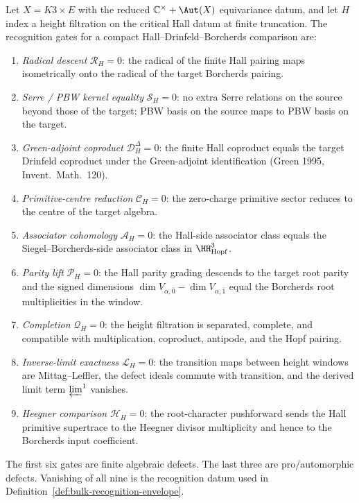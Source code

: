 \begin{definition}
\label{def:bulk-compact-coha-gates}
Let $X = K3 \times E$ with the reduced $\mathbb C^{\times} +
\Aut(X)$ equivariance datum, and let $H$ index a height filtration on
the critical Hall datum at finite truncation. The recognition gates for
a compact Hall--Drinfeld--Borcherds comparison are:
\begin{enumerate}[label=\textup{(O\arabic*)},leftmargin=2.4em,itemsep=2pt]
\item \emph{Radical descent} $\mathcal R_{H} = 0$: the radical of the
finite Hall pairing maps isometrically onto the radical of the target
Borcherds pairing.
\item \emph{Serre / PBW kernel equality} $\mathcal S_{H} = 0$: no
extra Serre relations on the source beyond those of the target;
PBW basis on the source maps to PBW basis on the target.
\item \emph{Green-adjoint coproduct} $\mathcal D^{\Delta}_{H} = 0$: the
finite Hall coproduct equals the target Drinfeld coproduct under
the Green-adjoint identification (Green 1995, Invent.\ Math.\
120).
\item \emph{Primitive-centre reduction} $\mathcal C_{H} = 0$: the
zero-charge primitive sector reduces to the centre of the target
algebra.
\item \emph{Associator cohomology} $\mathcal A_{H} = 0$: the
Hall-side associator class equals the Siegel--Borcherds-side
associator class in $\HH^{3}_{\mathrm{Hopf}}$.
\item \emph{Parity lift} $\mathcal P_{H} = 0$: the Hall parity grading
descends to the target root parity and the signed dimensions
$\dim V_{\alpha,\bar 0}-\dim V_{\alpha,\bar 1}$ equal the Borcherds
root multiplicities in the window.
\item \emph{Completion} $\mathcal Q_{H} = 0$: the height
filtration is separated, complete, and compatible with multiplication,
coproduct, antipode, and the Hopf pairing.
\item \emph{Inverse-limit exactness} $\mathcal L_{H} = 0$: the
transition maps between height windows are Mittag--Leffler, the defect
ideals commute with transition, and the derived limit term
$\varprojlim^{1}$ vanishes.
\item \emph{Heegner comparison} $\mathcal H_{H} = 0$: the root-character
pushforward sends the Hall primitive supertrace to the Heegner divisor
multiplicity and hence to the Borcherds input coefficient.
\end{enumerate}
The first six gates are finite algebraic defects. The last three are
pro/automorphic defects. Vanishing of all nine is the recognition
datum used in Definition~\ref{def:bulk-recognition-envelope}.
\end{definition}

